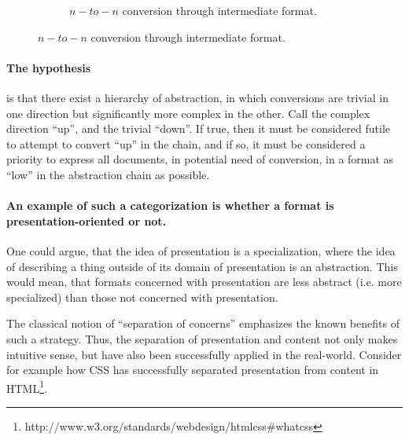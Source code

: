 \documentclass{scrreprt}
\begin{document}
\begin{figure}[h]
\begin{subfigure}{.5\textwidth}

    \caption{$n-to-n$ conversion through intermediate format.}
    \label{fig:n-to-n-conversion-boxes-with-intermediate-format}
  \end{subfigure}
  
  \label{fig:n-to-n-conversion-boxes}
\end{figure}



\paragraph{The hypothesis} is that there exist a hierarchy of abstraction, in which conversions are trivial in one direction but significantly more complex in the other. Call the complex direction ``up'', and the trivial ``down''. If true, then it must be considered futile to attempt to convert ``up'' in the chain, and if so, it must be considered a priority to express all documents, in potential need of conversion, in a format as ``low'' in the abstraction chain as possible. 

\paragraph{An example of such a categorization is whether a format is presentation-oriented or not.} One could argue, that the idea of presentation is a specialization, where the idea of describing a thing outside of its domain of presentation is an abstraction. This would mean, that formats concerned with presentation are less abstract (i.e. more specialized) than those not concerned with presentation.

The classical notion of ``separation of concerns'' emphasizes the known benefits of such a strategy. Thus, the separation of presentation and content not only makes intuitive sense, but have also been successfully applied in the real-world. Consider for example how CSS has successfully separated presentation from content in HTML\footnote{http://www.w3.org/standards/webdesign/htmlcss\#whatcss}.
\end{document}
